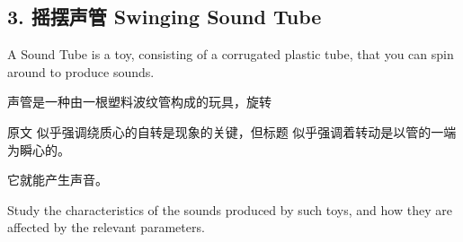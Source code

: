 \documentclass[a4paper,10pt,english]{sphinxmanual}
\begin{document}
\subsection{3. 摇摆声管 Swinging Sound Tube}
\label{\detokenize{7. Appendix:swinging-sound-tube}}
A Sound Tube is a toy, consisting of a corrugated plastic tube, that you can spin around to produce sounds.

声管是一种由一根塑料波纹管构成的玩具，旋转 %
\begin{footnote}[2]\sphinxAtStartFootnote
原文  似乎强调绕质心的自转是现象的关键，但标题  似乎强调着转动是以管的一端为瞬心的。
%
\end{footnote} 它就能产生声音。

Study the characteristics of the sounds produced by such toys, and how they are affected by the relevant parameters.
\end{document}
